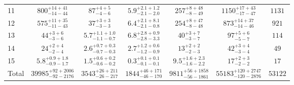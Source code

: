 \begin{tabular}{l c c c c c c}
11 & 
$800^{+14+41}_{-14-44}$ & 
$87^{+4+5}_{-4-6}$ & 
$5.9^{+2.1+1.2}_{-2.1-2.0}$ &  
$257^{+8+48}_{-8-49}$ &
$1150^{+17+43}_{-17-47}$ & 
$1131$\\
\rule{0pt}{2.75ex}

12 & 
$575^{+11+35}_{-11-43}$ & 
$37^{+3+3}_{-3-3}$ & 
$6.4^{+2.1+8.1}_{-2.1-0.8}$ &  
$254^{+8+47}_{-8-48}$ &
$873^{+14+37}_{-14-46}$ & 
$921$\\
\rule{0pt}{2.75ex}

13 & 
$44^{+3+6}_{-3-6}$ & 
$5.7^{+1.1+1.0}_{-1.1-0.7}$ & 
$6.8^{+2.8+0.9}_{-2.8-3.3}$ & 
$40^{+3+7}_{-3-7}$ & 
$97^{+5+6}_{-5-7}$ & 
$114$\\
\rule{0pt}{2.75ex}

14 & 
$24^{+2+4}_{-2-4}$ & 
$2.6^{+0.7+0.3}_{-0.7-0.3}$ & 
$2.7^{+1.2+0.6}_{-1.2-0.9}$ & 
$13^{+2+2}_{-2-3}$ & 
$42^{+3+4}_{-3-4}$ & 
$49$\\
\rule{0pt}{2.75ex}

15 & 
$5.8^{+0.9+1.8}_{-0.9-1.7}$ & 
$1.5^{+0.6+0.2}_{-0.6-0.2}$ & 
$0.3^{+0.1+0.1}_{-0.1-0.1}$ & 
$9.5^{+1.6+2.3}_{-1.6-2.2}$ & 
$17^{+2+3}_{-2-2}$ & 
$17$\\
\rule{0pt}{2.75ex}

Total & 
$39985^{+92+2006}_{-92-2176}$ &  
$3543^{+26+211}_{-26-217}$ & 
$1844^{+46+171}_{-46-170}$ & 
$9811^{+56+1858}_{-56-1861}$ &
$55183^{+120+2747}_{-120-2876}$ & 
$53122$\\
\hline
\end{tabular}
